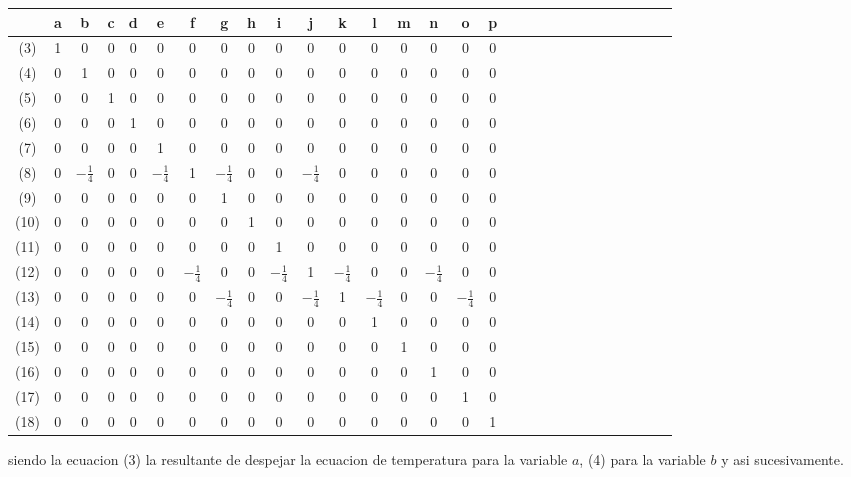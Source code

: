 \begin{center}
   \begin{tabular}{| c | c | c | c | c | c | c | c | c |c | c |c | c |c | c | c | c | c | c | c | c |c | c |c | c |c | c |c | c |}
     \hline
       & a  & b & c & d & e & f & g & h & i & j & k & l & m & n & o & p  \\ \hline
   (3) & 1  & 0 & 0 & 0 & 0 & 0 & 0 & 0 & 0 & 0 & 0 & 0 & 0 & 0 & 0 & 0 \\ \hline
   (4) & 0  & 1 & 0 & 0 & 0 & 0 & 0 & 0 & 0 & 0 & 0 & 0 & 0 & 0 & 0 & 0 \\ \hline
   (5) & 0  & 0 & 1 & 0 & 0 & 0 & 0 & 0 & 0 & 0 & 0 & 0 & 0 & 0 & 0 & 0 \\ \hline
   (6) & 0  & 0 & 0 & 1 & 0 & 0 & 0 & 0 & 0 & 0 & 0 & 0 & 0 & 0 & 0 & 0 \\ \hline
   (7) & 0  & 0 & 0 & 0 & 1 & 0 & 0 & 0 & 0 & 0 & 0 & 0 & 0 & 0 & 0 & 0 \\ \hline
   (8) & 0  & $-\frac{1}{4} $ & 0 & 0 & $-\frac{1}{4} $ & 1 & $-\frac{1}{4} $ & 0 & 0 & $-\frac{1}{4} $& 0 & 0 & 0 & 0 & 0 & 0 \\ \hline
   (9) & 0  & 0 & 0 & 0 & 0 & 0 & 1 & 0 & 0 & 0 & 0 & 0 & 0 & 0 & 0 & 0 \\ \hline
   (10) & 0  & 0 & 0 & 0 & 0 & 0 & 0 & 1 & 0 & 0 & 0 & 0 & 0 & 0 & 0 & 0 \\ \hline
   (11) & 0  & 0 & 0 & 0 & 0 & 0 & 0 & 0 & 1 & 0 & 0 & 0 & 0 & 0 & 0 & 0 \\ \hline
   (12) & 0  & 0 & 0 & 0 & 0 & $-\frac{1}{4} $ & 0 & 0 & $-\frac{1}{4} $ & 1 & $-\frac{1}{4} $ & 0 & 0 & $-\frac{1}{4} $ & 0 & 0 \\ \hline
   (13) & 0  & 0 & 0 & 0 & 0 & 0 & $-\frac{1}{4} $ & 0 & 0 & $-\frac{1}{4} $ & 1 & $-\frac{1}{4} $ & 0 & 0 & $-\frac{1}{4} $ & 0 \\ \hline
   (14) & 0  & 0 & 0 & 0 & 0 & 0 & 0 & 0 & 0 & 0 & 0 & 1 & 0 & 0 & 0 & 0 \\ \hline
   (15) & 0  & 0 & 0 & 0 & 0 & 0 & 0 & 0 & 0 & 0 & 0 & 0 & 1 & 0 & 0 & 0 \\ \hline
   (16) & 0  & 0 & 0 & 0 & 0 & 0 & 0 & 0 & 0 & 0 & 0 & 0 & 0 & 1 & 0 & 0 \\ \hline
   (17) & 0  & 0 & 0 & 0 & 0 & 0 & 0 & 0 & 0 & 0 & 0 & 0 & 0 & 0 & 1 & 0 \\ \hline
   (18) & 0  & 0 & 0 & 0 & 0 & 0 & 0 & 0 & 0 & 0 & 0 & 0 & 0 & 0 & 0 & 1 \\ \hline
   \end{tabular}
\end{center}
siendo la ecuacion (3) la resultante de despejar la ecuacion de temperatura para la variable $a$, (4) para la variable $b$ y asi sucesivamente.
